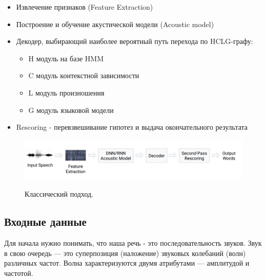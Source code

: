 \documentclass[a4paper,14pt]{extarticle}
\begin{document}
 	\begin{itemize}
 		\item Извлечение признаков (Feature Extraction)
 		\item Построение и обучение акустической модели (Acoustic model)
 		\item Декодер, выбирающий наиболее вероятный путь перехода по HCLG-графу:
 		\begin{itemize}
 			\item H модуль на базе HMM
 			\item C модуль контекстной зависимости
 			\item L модуль произношения
 			\item G модуль языковой модели
 		\end{itemize} 
 		\item Rescoring - перевзвешивание гипотез и выдача окончательного результата
 	\end{itemize}
 	
 	\begin{figure}[h!]
 		\begin{center}
 			{\includegraphics[scale = 0.6]{img/classic.png}}
 			\label{ris:classic}
 		\end{center}
 		\caption{Классический подход.}
 	\end{figure}
 
 	\subsection{Входные данные}
 	
 	Для начала нужно понимать, что наша речь - это последовательность звуков. Звук в свою очередь — это суперпозиция (наложение) звуковых колебаний (волн) различных частот. Волна характеризуются двумя атрибутами — амплитудой и частотой.
 	
\end{document}
